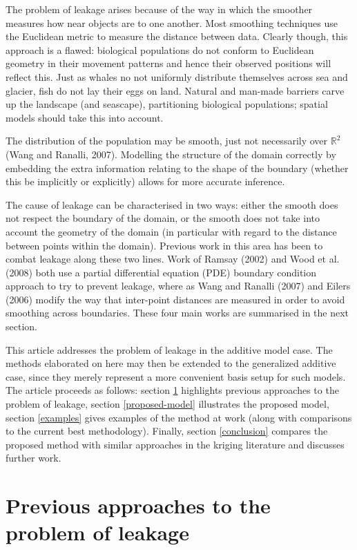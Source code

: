 \documentclass[useAMS,referee]{biom}
\begin{document}
The problem of leakage arises because of the way in which the smoother measures how near objects are to one another. Most smoothing techniques use the Euclidean metric to measure the distance between data. Clearly though, this approach is a flawed: biological populations do not conform to Euclidean geometry in their movement patterns and hence their observed positions will reflect this. Just as whales no not uniformly distribute themselves across sea and glacier, fish do not lay their eggs on land. Natural and man-made barriers carve up the landscape (and seascape), partitioning biological populations; spatial models should take this into account.

The distribution of the population may be smooth, just not necessarily over $\mathbb{R}^2$ (Wang and Ranalli, 2007). Modelling the structure of the domain correctly by embedding the extra information relating to the shape of the boundary (whether this be implicitly or explicitly) allows for more accurate inference.

The cause of leakage can be characterised in two ways: either the smooth does not respect the boundary of the domain, or the smooth does not take into account the geometry of the domain (in particular with regard to the distance between points within the domain). Previous work in this area has been to combat leakage along these two lines. Work of Ramsay (2002) and Wood et al. (2008) both use a partial differential equation (PDE) boundary condition approach to try to prevent leakage, where as Wang and Ranalli (2007) and Eilers (2006) modify the way that inter-point distances are measured in order to avoid smoothing across boundaries. These four main works are summarised in the next section.

This article addresses the problem of leakage in the additive model case. The methods elaborated on here may then be extended to the generalized additive case, since they merely represent a more convenient basis setup for such models. The article proceeds as follows: section \ref{previous-approaches} highlights previous approaches to the problem of leakage, section \ref{proposed-model} illustrates the proposed model, section \ref{examples} gives examples of the method at work (along with comparisons to the current best methodology). Finally, section \ref{conclusion} compares the proposed method with similar approaches in the kriging literature and discusses further work.

\section{Previous approaches to the problem of leakage}
\label{previous-approaches}
\end{document}
